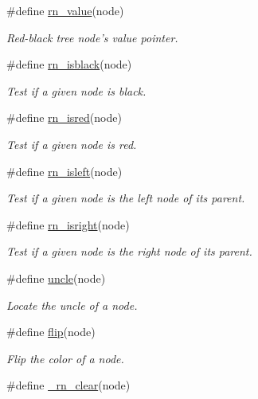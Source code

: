 \begin{CompactItemize}
\#define \hyperlink{group__dbprim__rbtree_ga39}{rn\_\-value}(node)
\begin{CompactList}\small\item\em Red-black tree node's value pointer. \item\end{CompactList}\item 
\#define \hyperlink{group__dbprim__rbtree_ga40}{rn\_\-isblack}(node)
\begin{CompactList}\small\item\em Test if a given node is black. \item\end{CompactList}\item 
\#define \hyperlink{group__dbprim__rbtree_ga41}{rn\_\-isred}(node)
\begin{CompactList}\small\item\em Test if a given node is red. \item\end{CompactList}\item 
\#define \hyperlink{group__dbprim__rbtree_ga42}{rn\_\-isleft}(node)
\begin{CompactList}\small\item\em Test if a given node is the left node of its parent. \item\end{CompactList}\item 
\#define \hyperlink{group__dbprim__rbtree_ga43}{rn\_\-isright}(node)
\begin{CompactList}\small\item\em Test if a given node is the right node of its parent. \item\end{CompactList}\item 
\#define \hyperlink{group__dbprim__rbtree_ga44}{uncle}(node)
\begin{CompactList}\small\item\em Locate the uncle of a node. \item\end{CompactList}\item 
\#define \hyperlink{group__dbprim__rbtree_ga45}{flip}(node)
\begin{CompactList}\small\item\em Flip the color of a node. \item\end{CompactList}\item 
\#define \hyperlink{group__dbprim__rbtree_ga46}{\_\-rn\_\-clear}(node)

\end{CompactItemize}
